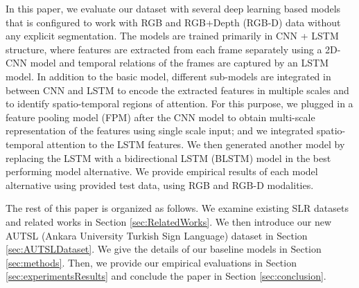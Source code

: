 \documentclass[11pt, a4paper, singlecolumn]{article}
\begin{document}
In this paper, we evaluate our dataset with several deep learning based models that is configured to work with RGB and RGB+Depth (RGB-D) data without any explicit segmentation. The models are trained primarily in CNN + LSTM structure, where features are extracted from each frame separately using a 2D-CNN model and temporal relations of the frames are captured by an LSTM model. In addition to the basic model, different sub-models are integrated in between CNN and LSTM to encode the extracted features in multiple scales and to identify spatio-temporal regions of attention. For this purpose, we plugged in a feature pooling model (FPM) after the CNN model to obtain multi-scale representation of the features using single scale input; and we integrated spatio-temporal attention to the LSTM features. We then generated another model by replacing the LSTM with a bidirectional LSTM (BLSTM) model in the best performing model alternative. We provide empirical results of each model alternative using provided test data, using RGB and RGB-D modalities. 

The rest of this paper is organized as follows. We examine existing SLR datasets and related works in Section \ref{sec:RelatedWorks}. We then introduce our new AUTSL (Ankara University Turkish Sign Language) dataset in Section \ref{sec:AUTSLDataset}. We give the details of our baseline models in Section \ref{sec:methods}. Then, we provide our empirical evaluations in Section \ref{sec:experimentsResults} and conclude the paper in Section \ref{sec:conclusion}.
\end{document}

